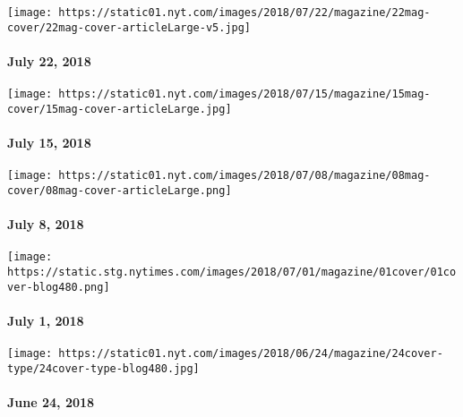 \href{https://www.nytimes.com/issue/magazine/2018/07/20/the-72218-issue}{}

\texttt{[image: https://static01.nyt.com/images/2018/07/22/magazine/22mag-cover/22mag-cover-articleLarge-v5.jpg]}

\hypertarget{july-22-2018}{%
\paragraph{July 22, 2018}\label{july-22-2018}}

\href{https://www.nytimes.com/issue/magazine/2018/07/17/the-71518-issue}{}

\texttt{[image: https://static01.nyt.com/images/2018/07/15/magazine/15mag-cover/15mag-cover-articleLarge.jpg]}

\hypertarget{july-15-2018}{%
\paragraph{July 15, 2018}\label{july-15-2018}}

\href{https://www.nytimes.com/issue/magazine/2018/07/10/the-7818-issue}{}

\texttt{[image: https://static01.nyt.com/images/2018/07/08/magazine/08mag-cover/08mag-cover-articleLarge.png]}

\hypertarget{july-8-2018}{%
\paragraph{July 8, 2018}\label{july-8-2018}}

\href{https://www.nytimes.com/issue/magazine/2018/06/28/the-7118-issue}{}

\texttt{[image: https://static.stg.nytimes.com/images/2018/07/01/magazine/01cover/01cover-blog480.png]}

\hypertarget{july-1-2018}{%
\paragraph{July 1, 2018}\label{july-1-2018}}

\href{https://www.nytimes.com/issue/magazine/2018/06/20/the-62418-issue}{}

\texttt{[image: https://static01.nyt.com/images/2018/06/24/magazine/24cover-type/24cover-type-blog480.jpg]}

\hypertarget{june-24-2018}{%
\paragraph{June 24, 2018}\label{june-24-2018}}

